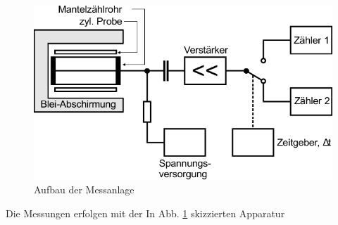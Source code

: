 \begin{figure}
    \centering
    \includegraphics{Abbildungen/Schaltplan.pdf}
    \caption{Aufbau der Messanlage \cite{man:v702}}
    \label{fig:Aufbau}
\end{figure}
Die Messungen erfolgen mit der In Abb. \ref{fig:Aufbau} skizzierten Apparatur